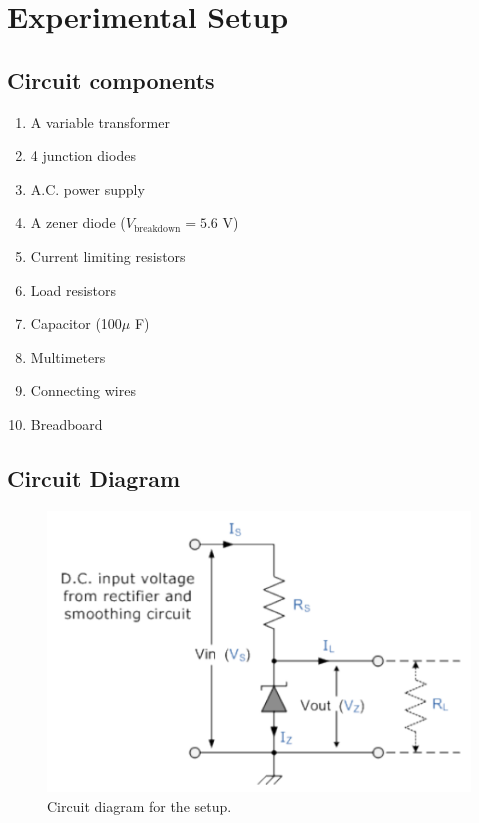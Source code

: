 \section{Experimental Setup}

\subsection*{Circuit components}
    \begin{enumerate}
        \item A variable transformer
        \item 4 junction diodes
        \item A.C. power supply
        \item A zener diode ($V_\text{breakdown} = 5.6$ V)
        \item Current limiting resistors
        \item Load resistors
        \item Capacitor (100$\mu$ F)
        \item Multimeters
        \item Connecting wires
        \item Breadboard
    \end{enumerate}

    \subsection*{Circuit Diagram}
    \begin{figure}[H]
        \centering
        \includegraphics[width=1\columnwidth]{images/f1.png}
        \caption{Circuit diagram for the setup.}
        \label{fig:1}
    \end{figure}


